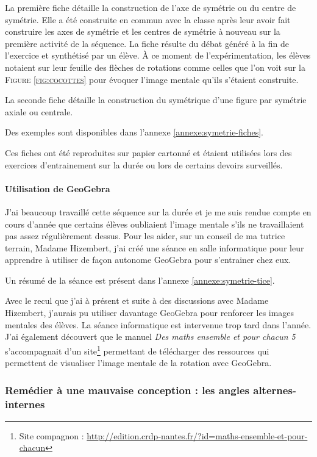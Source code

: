 La première fiche détaille la construction de l'axe de symétrie ou du centre de symétrie. Elle a été construite en commun avec la classe après leur avoir fait construire les axes de symétrie et les centres de symétrie à nouveau sur la première activité de la séquence. La fiche résulte du débat généré à la fin de l'exercice et synthétisé par un élève. À ce moment de l'expérimentation, les élèves notaient sur leur feuille des flèches de rotations comme celles que l'on voit sur la \textsc{Figure \ref{fig:cocottes}} pour évoquer l'image mentale qu'ils s'étaient construite.

La seconde fiche détaille la construction du symétrique d'une figure par symétrie axiale ou centrale.

Des exemples sont disponibles dans l'annexe \ref{annexe:symetrie-fiches}.

Ces fiches ont été reproduites sur papier cartonné et étaient utilisées lors des exercices d'entrainement sur la durée ou lors de certains devoirs surveillés.

\paragraph{Utilisation de GeoGebra}

J'ai beaucoup travaillé cette séquence sur la durée et je me suis rendue compte en cours d'année que certains élèves oubliaient l'image mentale s'ils ne travaillaient pas assez régulièrement dessus. Pour les aider, sur un conseil de ma tutrice terrain, Madame Hizembert, j'ai créé une séance en salle informatique pour leur apprendre à utiliser de façon autonome GeoGebra pour s'entrainer chez eux.

Un résumé de la séance est présent dans l'annexe \ref{annexe:symetrie-tice}.

Avec le recul que j'ai à présent et suite à des discussions avec Madame Hizembert, j'aurais pu utiliser davantage GeoGebra pour renforcer les images mentales des élèves. La séance informatique est intervenue trop tard dans l'année. J'ai également découvert que le manuel \textit{Des maths ensemble et pour chacun 5} s'accompagnait d'un site\footnote{Site compagnon : \url{http://edition.crdp-nantes.fr/?id=maths-ensemble-et-pour-chacun}} permettant de télécharger des ressources qui permettent de visualiser l'image mentale de la rotation avec GeoGebra.

\subsubsection{Remédier à une mauvaise conception : les angles alternes-internes}

